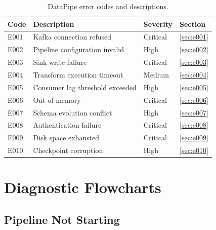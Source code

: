 \documentclass[
    language=english,
    doctype=manual,
    institution=none,
    titlestyle=book,
    oneside,
]{../../omnilatex}
\begin{document}
\begin{table}[htbp]
    \centering
    \caption{DataPipe error codes and descriptions.}
    \label{tab:error-codes}
    \begin{tabular}{@{}p{2cm}p{4cm}p{2cm}p{3cm}@{}}
        \toprule
        Code & Description & Severity & Section \\
        \midrule
        E001 & Kafka connection refused & Critical & \cref{sec:e001} \\
        E002 & Pipeline configuration invalid & High & \cref{sec:e002} \\
        E003 & Sink write failure & Critical & \cref{sec:e003} \\
        E004 & Transform execution timeout & Medium & \cref{sec:e004} \\
        E005 & Consumer lag threshold exceeded & High & \cref{sec:e005} \\
        E006 & Out of memory & Critical & \cref{sec:e006} \\
        E007 & Schema evolution conflict & High & \cref{sec:e007} \\
        E008 & Authentication failure & Critical & \cref{sec:e008} \\
        E009 & Disk space exhausted & Critical & \cref{sec:e009} \\
        E010 & Checkpoint corruption & High & \cref{sec:e010} \\
        \bottomrule
    \end{tabular}
\end{table}

\chapter{Diagnostic Flowcharts}
\label{sec:flowcharts}

\section{Pipeline Not Starting}
\end{document}
